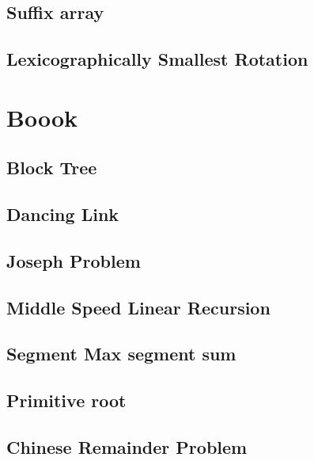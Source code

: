 \documentclass[a4paper,10pt,twocolumn,oneside]{article}
\begin{document}
\subsection{Suffix array}


\subsection{Lexicographically Smallest Rotation}

\section{Boook}

\subsection{Block Tree}


\subsection{Dancing Link}


\subsection{Joseph Problem}


\subsection{Middle Speed Linear Recursion}


\subsection{Segment Max segment sum}


\subsection{Primitive root}


\subsection{Chinese Remainder Problem}

\end{document}
